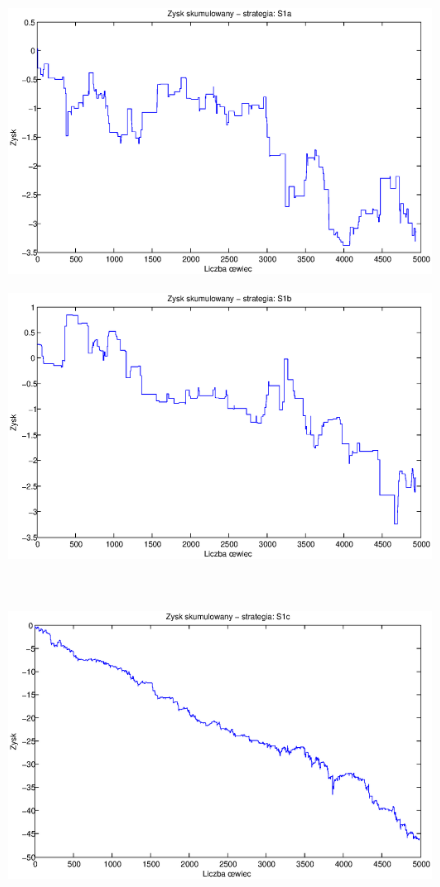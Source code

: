 \documentclass{tewiart}
\begin{document}
\begin{figure}[h]
\centering
\begin{minipage}{.49\linewidth}
\centering \includegraphics[width=\textwidth]{S1a.eps}
\label{jedno}
\end{minipage}
\begin{minipage}{.49\linewidth}
\centering \includegraphics[width=\textwidth]{S1b.eps}
\label{dwu}
\end{minipage}
\\
\begin{minipage}{.49\linewidth}
\centering \includegraphics[width=\textwidth]{S1c.eps}

\end{minipage}
\end{figure}
\end{document}
